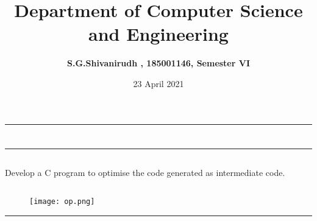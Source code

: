\documentclass[12pt,letterpaper]{article}
\title{\textbf{Department of Computer Science and Engineering}}
\author{\textbf{S.G.Shivanirudh , 185001146, Semester VI }}
\date{23 April 2021}
\begin{document}
\maketitle
\hrule
\section*{}
\hrule 
\bigskip\bigskip

\subsection*{}

\subsection*{}
\begin{flushleft}
    Develop a C program to optimise the code generated as intermediate code. 
\end{flushleft}

\subsection*{}
\begin{flushleft}

\end{flushleft}

\newpage
\subsection*{}
\begin{flushleft}
    
\end{flushleft}
\newpage
\subsection*{}
\begin{figure}[h]
    \centering
    \texttt{[image: op.png]}
\end{figure}
\hrule
\end{document}
